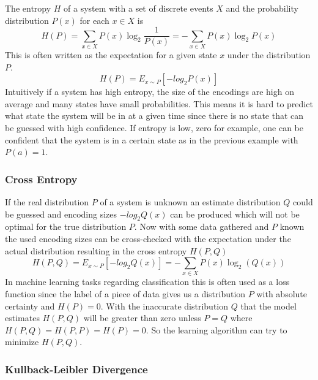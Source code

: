 The entropy $H$ of a system with a set of discrete events $X$ and the probability distribution $P(x)$
for each $x\in X$ is
\begin{equation}
    H(P)=\sum_{x\in X} P(x)\log_{2} \frac{1}{P(x)} = -\sum_{x\in X} P(x)\log_{2} P(x)
\end{equation}
This is often written as the expectation for a  given state $x$ under the distribution $P$.
\[ H(P)=E_{x\sim P}[-log_{2}P(x)]\]
Intuitively if a system has high entropy, the size of the encodings are high on average and many states
have small probabilities. This means it is hard to predict what state the system will be in at a given time
since there is no state that can be guessed with high confidence. If entropy is low, zero for example,
one can be confident that the system is in a certain state as in the previous example with $P(a)=1$.


\subsubsection{Cross Entropy}

If the real distribution $P$ of a system is unknown an estimate distribution $Q$ could be guessed
and encoding sizes $-log_{2}Q(x)$ can be produced which will not be optimal for the true distribution
$P$. Now with some data gathered and $P$ known the used encoding sizes can be cross-checked with the
expectation under the actual distribution resulting in the cross entropy $H(P,Q)$
\begin{equation}
    H(P,Q)=E_{x\sim P}[-log_{2}Q(x)]=-\sum_{x\in X} P(x)\log_{2} (Q(x))
\end{equation}
In machine learning tasks regarding classification this is often used as a loss function since the
label of a piece of data gives us a distribution $P$ with absolute certainty and $H(P)=0$. With the
inaccurate distribution $Q$ that the model estimates $H(P,Q)$ will be greater than zero unless
$P=Q$ where $H(P,Q)=H(P,P)=H(P)=0$. So the learning algorithm can try to minimize $H(P,Q)$.

\subsubsection{Kullback-Leibler Divergence}

